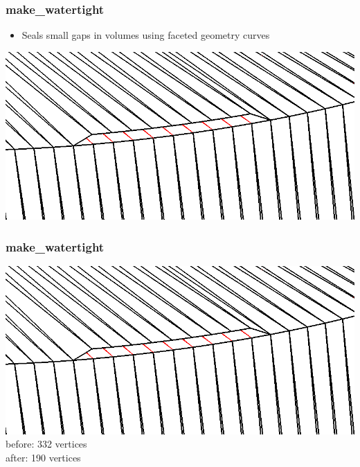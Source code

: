 \documentclass[14pt]{beamer}
\begin{document}
\begin{frame}
\frametitle{make\_watertight}
\begin{itemize}
\item Seals small gaps in volumes using faceted geometry curves
\end{itemize}
\begin{center}
\includegraphics[scale=0.25, trim = 0 200 0 0 ]{cyl_loop_close.png}

\end{center}

\end{frame}


\begin{frame}
\frametitle{make\_watertight}

\begin{center}


\includegraphics[scale=0.25, trim = 0 0 0 0 ]{cyl_loop_close.png}
\vfill 
before: 332 vertices \\ after: 190 vertices
\end{center}
\end{frame}
\end{document}
